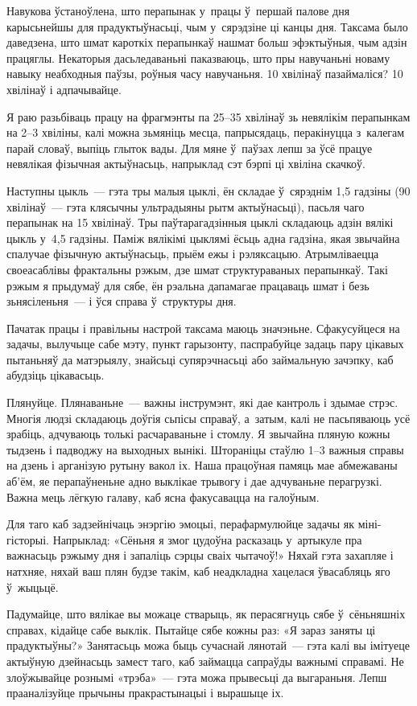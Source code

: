 Навукова ўстаноўлена, што перапынак у~працы ў~першай палове дня карысьнейшы для прадуктыўнасьці, чым у~сярэдзіне ці канцы дня. Таксама было даведзена, што шмат кароткіх перапынкаў нашмат больш эфэктыўныя, чым адзін працяглы. Некаторыя дасьледаваньні паказваюць, што пры навучаньні новаму навыку неабходныя паўзы, роўныя часу навучаньня. 10 хвілінаў пазаймаліся? 10 хвілінаў і адпачывайце.

Я раю разьбіваць працу на фрагмэнты па 25--35 хвілінаў зь невялікім перапынкам на 2--3 хвіліны, калі можна зьмяніць месца, папрысядаць, перакінуцца з~калегам парай словаў, выпіць глыток вады. Для мяне ў~паўзах лепш за ўсё працуе невялікая фізычная актыўнасьць, напрыклад сэт бэрпі ці хвіліна скачкоў. 

Наступны цыкль~--- гэта тры малыя цыклі, ён складае ў~сярэднім 1,5 гадзіны (90 хвілінаў~--- гэта клясычны ультрадыяны рытм актыўнасьці), пасьля чаго перапынак на 15 хвілінаў. Тры паўтарагадзінныя цыклі складаюць адзін вялікі цыкль у~4,5 гадзіны. Паміж вялікімі цыклямі ёсьць адна гадзіна, якая звычайна спалучае фізычную актыўнасьць, прыём ежы і рэляксацыю. Атрымліваецца своеасаблівы фрактальны рэжым, дзе шмат структураваных перапынкаў. Такі рэжым я прыдумаў для сябе, ён рэальна дапамагае працаваць шмат і безь зьнясіленьня~--- і ўся справа ў~структуры дня.

Пачатак працы і правільны настрой таксама маюць значэньне. Сфакусуйцеся на задачы, вылучыце сабе мэту, пункт гарызонту, паспрабуйце задаць пару цікавых пытаньняў да матэрыялу, знайсьці супярэчнасьці або займальную зачэпку, каб абудзіць цікавасьць.

Плянуйце. Плянаваньне~--- важны інструмэнт, які дае кантроль і здымае стрэс. Многія людзі складаюць доўгія сьпісы справаў, а~затым, калі не пасьпяваюць усё зрабіць, адчуваюць толькі расчараваньне і стомлу. Я звычайна пляную кожны тыдзень і падводжу на выходных вынікі. Штораніцы стаўлю 1--3 важныя справы на дзень і арганізую рутыну вакол іх. Наша працоўная памяць мае абмежаваны аб'ём, яе перапаўненьне адно выклікае трывогу і дае адчуваньне перагрузкі. Важна мець лёгкую галаву, каб ясна факусавацца на галоўным.

Для таго каб задзейнічаць энэргію эмоцыі, перафармулюйце задачы як міні-гісторыі. Напрыклад: «Сёньня я змог цудоўна расказаць у~артыкуле пра важнасьць рэжыму дня і запаліць сэрцы сваіх чытачоў!» Няхай гэта захапляе і натхняе, няхай ваш плян будзе такім, каб неадкладна хацелася ўвасабляць яго ў~жыцьцё.

Падумайце, што вялікае вы можаце стварыць, як перасягнуць сябе ў~сёньняшніх справах, кідайце сабе выклік. Пытайце сябе кожны раз: «Я зараз заняты ці прадуктыўны?» Занятасьць можа быць сучаснай лянотай~--- гэта калі вы імітуеце актыўную дзейнасьць замест таго, каб займацца сапраўды важнымі справамі. Не злоўжывайце рознымі «трэба»~--- гэта можа прывесьці да выгараньня. Лепш прааналізуйце прычыны пракрастынацыі і вырашыце іх.

